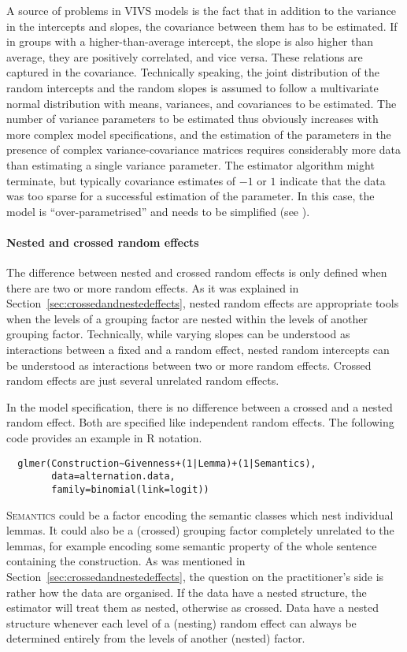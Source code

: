 A source of problems in VIVS models is the fact that in addition to the variance in the intercepts and slopes, the covariance between them has to be estimated.
If in groups with a higher-than-average intercept, the slope is also higher than average, they are positively correlated, and vice versa.
These relations are captured in the covariance.
Technically speaking, the joint distribution of the random intercepts and the random slopes is assumed to follow a multivariate normal distribution with means, variances, and covariances to be estimated.
The number of variance parameters to be estimated thus obviously increases with more complex model specifications, and the estimation of the parameters in the presence of complex variance-covariance matrices requires considerably more data than estimating a single variance parameter.
The estimator algorithm might terminate, but typically covariance estimates of $-1$ or $1$ indicate that the data was too sparse for a successful estimation of the parameter.
In this case, the model is ``over-parametrised'' and needs to be simplified (see \citealt{BatesEa2015a,MatuschekEa2017}).

\paragraph{Nested and crossed random effects}

The difference between nested and crossed random effects is only defined when there are two or more random effects.
As it was explained in Section~\ref{sec:crossedandnestedeffects}, nested random effects are appropriate tools when the levels of a grouping factor are nested within the levels of another grouping factor.
Technically, while varying slopes can be understood as interactions between a fixed and a random effect, nested random intercepts can be understood as interactions between two or more random effects.
Crossed random effects are just several unrelated random effects.

In the model specification, there is no difference between a crossed and a nested random effect.
Both are specified like independent random effects.
The following code provides an example in R notation.

\begin{lstlisting}
  glmer(Construction~Givenness+(1|Lemma)+(1|Semantics),
        data=alternation.data,
        family=binomial(link=logit))
\end{lstlisting}

\textsc{Semantics} could be a factor encoding the semantic classes which nest individual lemmas.
It could also be a (crossed) grouping factor completely unrelated to the lemmas, for example encoding some semantic property of the whole sentence containing the construction.
As was mentioned in Section~\ref{sec:crossedandnestedeffects}, the question on the practitioner's side is rather how the data are organised.
If the data have a nested structure, the estimator will treat them as nested, otherwise as crossed.
Data have a nested structure whenever each level of a (nesting) random effect can always be determined entirely from the levels of another (nested) factor.


